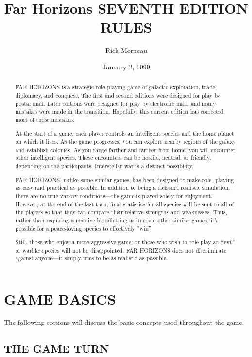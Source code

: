 \documentclass[10pt,titlepage]{article}
\title{
\textbf{{\Huge Far Horizons}}
\vspace{10pt}
\hline
\vspace{10pt}
{\small\MakeUppercase{Seventh Edition Rules}}
}
\author{Rick Morneau}
\date{January 2, 1999}
\begin{document}
\maketitle
\begin{abstract}
FAR HORIZONS is a strategic role-playing game of galactic exploration, trade,
diplomacy, and conquest.  The first and second editions were designed for play
by postal mail.  Later editions were designed for play by electronic mail, and
many mistakes were made in the transition.  Hopefully, this current edition has
corrected most of those mistakes.

At the start of a game, each player controls an intelligent species and the
home planet on which it lives.  As the game progresses, you can explore nearby
regions of the galaxy and establish colonies.  As you range farther and farther
from home, you will encounter other intelligent species.  These encounters can
be hostile, neutral, or friendly, depending on the participants.  Interstellar
war is a distinct possibility.

FAR HORIZONS, unlike some similar games, has been designed to make role-
playing as easy and practical as possible.  In addition to being a rich and
realistic simulation, there are no true victory conditions---the game is played
solely for enjoyment.  However, at the end of the last turn, final statistics
for all species will be sent to all of the players so that they can compare
their relative strengths and weaknesses.  Thus, rather than requiring a massive
bloodletting as in some other similar games, it's possible for a peace-loving
species to effectively ``win''.

Still, those who enjoy a more aggressive game, or those who wish to role-play
an ``evil'' or warlike species will not be disappointed.  FAR HORIZONS does not
discriminate against anyone---it simply tries to be as realistic as possible.
\end{abstract}
\newpage
\tableofcontents
\newpage

\section{GAME BASICS}

The following sections will discuss the basic concepts used throughout the
game.


\subsection{THE GAME TURN}
\end{document}
